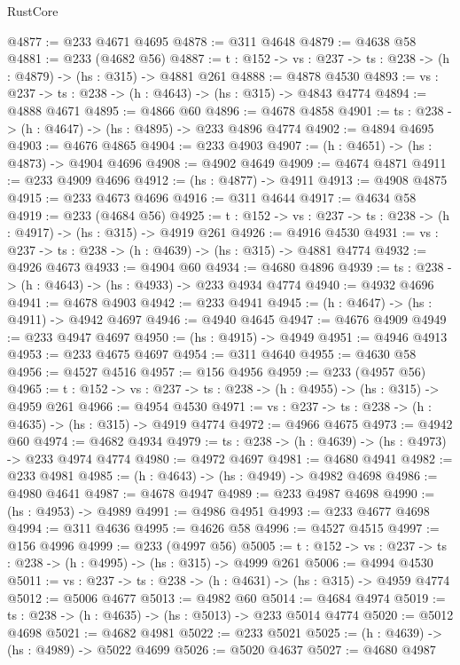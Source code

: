 \begin{lexlean}{RustCore}
\begin{coremodule}
@4877 := @233 @4671 @4695
@4878 := @311 @4648
@4879 := @4638 @58
@4881 := @233 (@4682 @56)
@4887 := {t : @152} -> {vs : @237} -> {ts : @238} -> (h : @4879) -> (hs : @315) -> @4881 @261
@4888 := @4878 @4530
@4893 := {vs : @237} -> {ts : @238} -> (h : @4643) -> (hs : @315) -> @4843 @4774
@4894 := @4888 @4671
@4895 := @4866 @60
@4896 := @4678 @4858
@4901 := {ts : @238} -> (h : @4647) -> (hs : @4895) -> @233 @4896 @4774
@4902 := @4894 @4695
@4903 := @4676 @4865
@4904 := @233 @4903
@4907 := (h : @4651) -> (hs : @4873) -> @4904 @4696
@4908 := @4902 @4649
@4909 := @4674 @4871
@4911 := @233 @4909 @4696
@4912 := (hs : @4877) -> @4911
@4913 := @4908 @4875
@4915 := @233 @4673 @4696
@4916 := @311 @4644
@4917 := @4634 @58
@4919 := @233 (@4684 @56)
@4925 := {t : @152} -> {vs : @237} -> {ts : @238} -> (h : @4917) -> (hs : @315) -> @4919 @261
@4926 := @4916 @4530
@4931 := {vs : @237} -> {ts : @238} -> (h : @4639) -> (hs : @315) -> @4881 @4774
@4932 := @4926 @4673
@4933 := @4904 @60
@4934 := @4680 @4896
@4939 := {ts : @238} -> (h : @4643) -> (hs : @4933) -> @233 @4934 @4774
@4940 := @4932 @4696
@4941 := @4678 @4903
@4942 := @233 @4941
@4945 := (h : @4647) -> (hs : @4911) -> @4942 @4697
@4946 := @4940 @4645
@4947 := @4676 @4909
@4949 := @233 @4947 @4697
@4950 := (hs : @4915) -> @4949
@4951 := @4946 @4913
@4953 := @233 @4675 @4697
@4954 := @311 @4640
@4955 := @4630 @58
@4956 := @4527 @4516
@4957 := @156 @4956
@4959 := @233 (@4957 @56)
@4965 := {t : @152} -> {vs : @237} -> {ts : @238} -> (h : @4955) -> (hs : @315) -> @4959 @261
@4966 := @4954 @4530
@4971 := {vs : @237} -> {ts : @238} -> (h : @4635) -> (hs : @315) -> @4919 @4774
@4972 := @4966 @4675
@4973 := @4942 @60
@4974 := @4682 @4934
@4979 := {ts : @238} -> (h : @4639) -> (hs : @4973) -> @233 @4974 @4774
@4980 := @4972 @4697
@4981 := @4680 @4941
@4982 := @233 @4981
@4985 := (h : @4643) -> (hs : @4949) -> @4982 @4698
@4986 := @4980 @4641
@4987 := @4678 @4947
@4989 := @233 @4987 @4698
@4990 := (hs : @4953) -> @4989
@4991 := @4986 @4951
@4993 := @233 @4677 @4698
@4994 := @311 @4636
@4995 := @4626 @58
@4996 := @4527 @4515
@4997 := @156 @4996
@4999 := @233 (@4997 @56)
@5005 := {t : @152} -> {vs : @237} -> {ts : @238} -> (h : @4995) -> (hs : @315) -> @4999 @261
@5006 := @4994 @4530
@5011 := {vs : @237} -> {ts : @238} -> (h : @4631) -> (hs : @315) -> @4959 @4774
@5012 := @5006 @4677
@5013 := @4982 @60
@5014 := @4684 @4974
@5019 := {ts : @238} -> (h : @4635) -> (hs : @5013) -> @233 @5014 @4774
@5020 := @5012 @4698
@5021 := @4682 @4981
@5022 := @233 @5021
@5025 := (h : @4639) -> (hs : @4989) -> @5022 @4699
@5026 := @5020 @4637
@5027 := @4680 @4987

\end{coremodule}
\end{lexlean}
